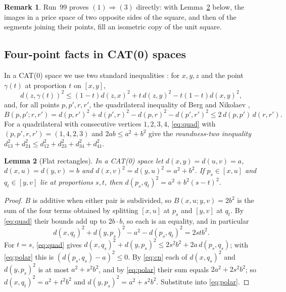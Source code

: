 \documentclass[11pt,a4paper]{article}
\newtheorem{lemma}{Lemma}[section]
\theoremstyle{definition}
\newtheorem{remark}[lemma]{Remark}
\begin{document}
\begin{remark}\label{rem:filling}
Run~99 proves $(1)\Rightarrow(3)$ directly: with Lemma~\ref{lem:rectangle} below,
the images in a price space of two opposite sides of the square, and then of the
segments joining their points, fill an isometric copy of the unit square.
\end{remark}

\subsection{Four-point facts in CAT(0) spaces}

In a CAT(0) space we use two standard inequalities \cite[Lemma~C.4(a),(b)]{Ant}:
for $x,y,z$ and the point $\gamma(t)$ at proportion $t$ on $[x,y]$,
\begin{equation}\label{eq:cn}
d(z,\gamma(t))^2\le(1-t)d(z,x)^2+t\,d(z,y)^2-t(1-t)d(x,y)^2,
\end{equation}
and, for all points $p,p',r,r'$, the quadrilateral inequality of Berg and
Nikolaev \cite{BN},
\begin{equation}\label{eq:quad}
B(p,p';r,r')=d(p,r')^2+d(p',r)^2-d(p,r)^2-d(p',r')^2\le2\,d(p,p')\,d(r,r').
\end{equation}
For a quadrilateral with consecutive vertices $1,2,3,4$, \eqref{eq:quad} with
$(p,p',r,r')=(1,4,2,3)$ and $2ab\le a^2+b^2$ give the \emph{roundness-two
inequality} $d_{13}^2+d_{24}^2\le d_{12}^2+d_{23}^2+d_{34}^2+d_{41}^2$.

\begin{lemma}[Flat rectangles]\label{lem:rectangle}
In a CAT(0) space let $d(x,y)=d(u,v)=a$, $d(x,u)=d(y,v)=b$ and
$d(x,v)^2=d(y,u)^2=a^2+b^2$. If $p_s\in[x,u]$ and $q_t\in[y,v]$ lie at
proportions $s,t$, then $d(p_s,q_t)^2=a^2+b^2(s-t)^2$.
\end{lemma}

\begin{proof}
$B$ is additive when either pair is subdivided, so $B(x,u;y,v)=2b^2$ is the sum of
the four terms obtained by splitting $[x,u]$ at $p_s$ and $[y,v]$ at $q_t$. By
\eqref{eq:quad} their bounds add up to $2b\cdot b$, so each is an equality, and
in particular
\begin{equation}\label{eq:polar}
d(x,q_t)^2+d(y,p_s)^2-a^2-d(p_s,q_t)^2=2stb^2 .
\end{equation}
For $t=s$, \eqref{eq:quad} gives
$d(x,q_s)^2+d(y,p_s)^2\le2s^2b^2+2a\,d(p_s,q_s)$; with \eqref{eq:polar} this is
$(d(p_s,q_s)-a)^2\le0$. By \eqref{eq:cn} each of $d(x,q_s)^2$ and $d(y,p_s)^2$ is
at most $a^2+s^2b^2$, and by \eqref{eq:polar} their sum equals $2a^2+2s^2b^2$;
so $d(x,q_t)^2=a^2+t^2b^2$ and $d(y,p_s)^2=a^2+s^2b^2$. Substitute into
\eqref{eq:polar}.
\end{proof}
\end{document}
